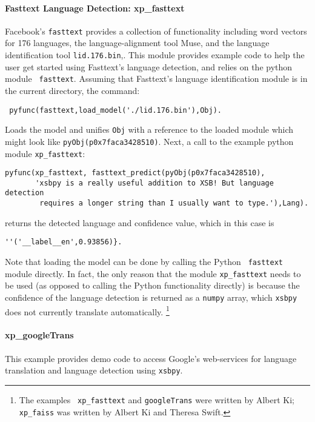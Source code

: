 \paragraph{Fasttext Language Detection: xp\_fasttext}
%
Facebook's {\tt fasttext} provides a collection of functionality
including word vectors for 176 languages, the language-alignment tool
Muse, and the language identification tool {\tt lid.176.bin},.  This
module provides example code to help the user get started using
Fasttext's language detection, and relies on the python module {\tt
  fasttext}.  Assuming that Fasttext's language identification module
is in the current directory, the command:
\begin{verbatim}
 pyfunc(fasttext,load_model('./lid.176.bin'),Obj).
\end{verbatim}
Loads the model and unifies {\tt Obj} with a reference to the loaded
module which might look like {\tt pyObj(p0x7faca3428510)}.  
Next, a call to the example python module {\tt xp\_fasttext}:
\begin{verbatim}
pyfunc(xp_fasttext, fasttext_predict(pyObj(p0x7faca3428510),
       'xsbpy is a really useful addition to XSB! But language detection
        requires a longer string than I usually want to type.'),Lang).  
\end{verbatim}
returns the detected language and confidence value, which in this case
is
\begin{verbatim}
''('__label__en',0.93856)}.
\end{verbatim}

Note that loading the model can be done by calling the Python {\tt
  fasttext} module directly.  In fact, the only reason that the module
{\tt xp\_fasttext} needs to be used (as opposed to calling the Python
functionality directly) is because the confidence of the language
detection is returned as a {\tt numpy} array, which {\tt xsbpy} does
not currently translate automatically. \footnote{The examples {\tt
    xp\_fasttext} and {\tt googleTrans} were written by Albert Ki;
  {\tt xp\_faiss} was written by Albert Ki and Theresa Swift.}

\paragraph{xp\_googleTrans}
This example provides demo code to access Google's web-services for
language translation and language detection using {\tt xsbpy}.


